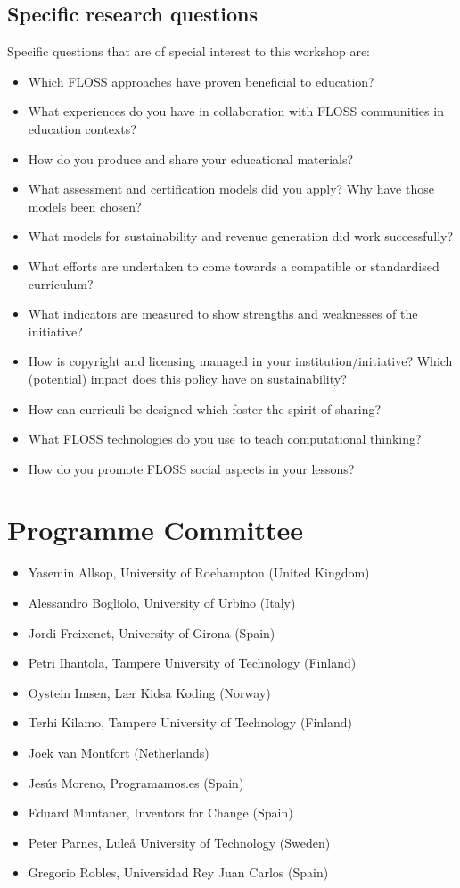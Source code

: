 \documentclass[ifip]{svmult}
\begin{document}
\subsection*{Specific research questions}
Specific questions that are of special interest to this workshop are: 
\begin{itemize}
 \item Which FLOSS approaches have proven beneficial to education?
 \item What experiences do you have in collaboration with FLOSS communities in education contexts?
 \item How do you produce and share your educational materials? 
 \item What assessment and certification models did you apply? Why have those models been chosen? 
 \item What models for sustainability and revenue generation did work successfully? 
 \item What efforts are undertaken to come towards a compatible or standardised curriculum? 
 \item What indicators are measured to show strengths and weaknesses of the initiative? 
 \item How is copyright and licensing managed in your institution/initiative? Which (potential) impact does this policy have on sustainability? 
 \item How can curriculi be designed which foster the spirit of sharing? 
 \item What FLOSS technologies do you use to teach computational thinking?
 \item How do you promote FLOSS social aspects in your lessons?
\end{itemize}
\section*{Programme Committee}
\begin{itemize}
	\item Yasemin Allsop, University of Roehampton (United Kingdom)
	\item Alessandro Bogliolo, University of Urbino (Italy)
	\item Jordi Freixenet, University of Girona (Spain)
	\item Petri Ihantola, Tampere University of Technology (Finland)
	\item Oystein Imsen, Lær Kidsa Koding (Norway)
	\item Terhi Kilamo, Tampere University of Technology (Finland)
	\item Joek van Montfort (Netherlands)
	\item Jesús Moreno, Programamos.es (Spain)
	\item Eduard Muntaner, Inventors for Change (Spain)
	\item Peter Parnes, Luleå University of Technology (Sweden)
	\item Gregorio Robles, Universidad Rey Juan Carlos (Spain)
\end{itemize}
\end{document}
